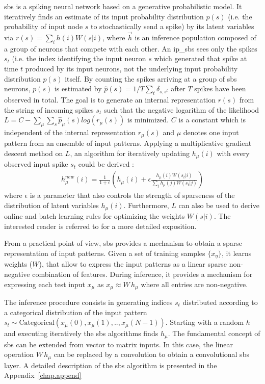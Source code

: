 \gls{sbs} is a spiking neural network based on a
generative probabilistic model. It iteratively finds an estimate of
its input probability distribution $p(s)$ (i.e. the probability of
input node $s$ to stochastically send a spike) by its latent variables
via $r(s) = \sum_i h(i) W(s|i)$, 
where $\vec{h}$ is an inference
population composed of a group of neurons that compete with each
other. An \gls{ip_sbs} sees only the spikes $s_t$ (i.e. the
index identifying the input neuron $s$ which generated that spike at
time $t$ produced by its input neurons, not the underlying input
probability distribution $p(s)$ itself. By counting the spikes
arriving at a group of \gls{sbs} neurons, $p(s)$ is estimated by
$\hat{p}(s) = 1/T \sum_t \delta_{s,s^t}$ after $T$ spikes have been
observed in total. The goal is to generate an internal representation
$r(s)$ from the string of incoming spikes $s_t$ such that the negative
logarithm of the likelihood
$L = C - \sum_\mu \sum_s \hat{p}_\mu(s) log\left( r_\mu(s) \right)$ is
minimized. $C$ is a constant which is independent of the internal
representation $r_\mu(s)$ and $\mu$ denotes one input pattern from an
ensemble of input patterns. Applying a multiplicative gradient descent
method on $L$, an algorithm for iteratively updating $h_\mu(i)$ with
every observed input spike $s_t$ could be derived
\cite{ernst2007efficient}:
\begin{eqnarray} \label{eq:sbs_update}
h_\mu^{new}(i) = \frac{1}{1+\epsilon} \left(h_\mu(i) + \epsilon \frac{h_\mu(i) W(s_t|i) }{\sum_j h_\mu(j) W(s_t|j)} \right) 
\end{eqnarray}
where $\epsilon$ is a parameter that also controls the strength of sparseness of the distribution of latent variables $h_\mu(i)$. Furthermore, $L$ can also be used to derive online and batch learning rules for optimizing the weights $W(s|i)$. The interested reader is referred to \cite{ernst2007efficient} for a more detailed exposition.

From a practical point of view, \gls{sbs} provides a mechanism to obtain a sparse representation of input patterns. Given a set of
training samples $\{x_\eta\}$, it learns weights ($W$), that allow
to express the input patterns as a linear sparse non-negative combination
of features.  During inference, it provides a mechanism for expressing
each test input $x_\mu$ as $x_\mu \approx W\, h_\mu$ where all
entries are non-negative.

The inference procedure consists in generating indices $s_t$
distributed according to a categorical distribution of the input pattern
$s_t \sim \mathrm{Categorical}(x_{\mu}(0), x_{\mu}(1), ..,
x_{\mu}(N-1))$. Starting with a random $h$ and executing
iteratively  the \gls{sbs} algorithms finds
$h_{\mu}$. The fundamental concept of \gls{sbs} can be extended from vector to matrix
inputs. In this case, the linear operation $W\, h_\mu$ can be replaced by a
convolution to obtain a convolutional \gls{sbs} layer. A detailed description of the \gls{sbs} algorithm is presented in the Appendix~\ref{chap.append}

